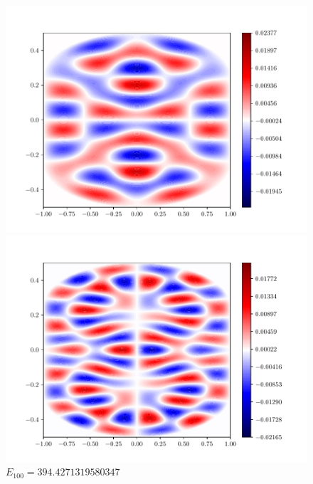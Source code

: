 \documentclass{article}
\begin{document}
\begin{enumerate}[1.]
\begin{enumerate}[(A)]
\begin{enumerate}[(i)]
\begin{figure}[H]
        \begin{minipage}{0.3\linewidth}
          \centering
          \includegraphics[width=\linewidth]{q6c-50.pdf}
          \caption*{$E_{50}= 204.00943730722977$}
        \end{minipage}
        \begin{minipage}{0.3\linewidth}
          \centering
          \includegraphics[width=\linewidth]{q6c-100.pdf}
          \caption*{$E_{100}= 394.4271319580347$}
        \end{minipage}
        \begin{minipage}{0.3\linewidth}
          \centering

\end{minipage}
\end{figure}
\end{enumerate}
\end{enumerate}
\end{enumerate}
\end{document}
